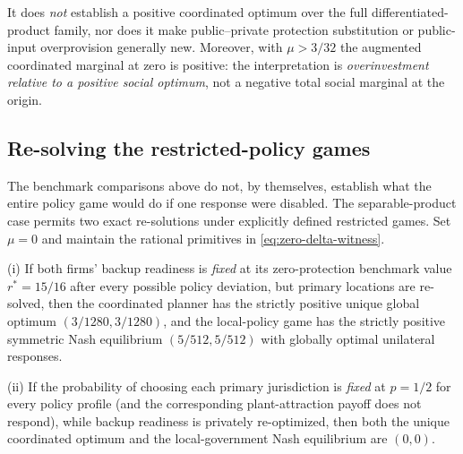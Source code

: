 It does \emph{not} establish
a positive coordinated optimum over the full differentiated-product
family, nor does it make public--private protection substitution or
public-input overprovision generally new. Moreover, with $\mu>3/32$
the augmented coordinated marginal at zero is positive: the
interpretation is \emph{overinvestment relative to a positive social
optimum}, not a negative total social marginal at the origin.


\subsection{Re-solving the restricted-policy games}
\label{sec:restricted-counterfactuals}

The benchmark comparisons above do not, by themselves, establish
what the entire policy game would do if one response were disabled.
The separable-product case permits two exact re-solutions under
explicitly defined restricted games. Set $\mu=0$ and maintain
the rational primitives in \eqref{eq:zero-delta-witness}.

\begin{proposition}
\label{prop:restricted-game-comparisons}
(i) If both firms' backup readiness is \emph{fixed} at its
zero-protection benchmark value $r^*=15/16$ after every possible policy
deviation, but primary locations are re-solved, then the coordinated
planner has the strictly positive unique global optimum
$(3/1280,3/1280)$, and the local-policy game has the strictly
positive symmetric Nash equilibrium $(5/512,5/512)$ with globally
optimal unilateral responses.

(ii) If the probability of choosing each primary jurisdiction
is \emph{fixed} at $p=1/2$ for every policy profile (and the
corresponding plant-attraction payoff does not respond), while
backup readiness is privately re-optimized, then both the unique
coordinated optimum and the local-government Nash equilibrium are
$(0,0)$.
\end{proposition}

